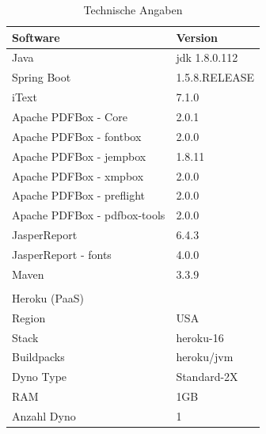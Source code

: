 \documentclass[main.tex]{subfiles}
\begin{document}
\begin{table}[!hb]
\label{softversion}
\begin{tabular}{ll}
Software          & Version   \\ \hline
Java        &      jdk 1.8.0.112      \\
Spring Boot &         1.5.8.RELEASE        \\

iText        &        7.1.0  \\
Apache PDFBox - Core &  2.0.1 \\
Apache PDFBox - fontbox & 2.0.0 \\
Apache PDFBox - jempbox & 1.8.11 \\
Apache PDFBox - xmpbox & 2.0.0 \\
Apache PDFBox - preflight & 2.0.0 \\
Apache PDFBox - pdfbox-tools & 2.0.0 \\
JasperReport & 6.4.3 \\
JasperReport - fonts & 4.0.0 \\
Maven   &  3.3.9 \\
 & \\

Heroku (PaaS)    & \\ \hline
Region & USA \\
Stack & heroku-16 \\
Buildpacks & heroku/jvm \\
Dyno Type & Standard-2X \\
RAM & 1GB \\
Anzahl Dyno & 1 \\


\end{tabular}
\caption{Technische Angaben}
\end{table}
\end{document}
